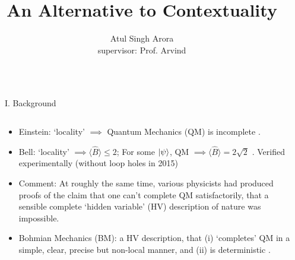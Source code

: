 \documentclass[final,hyperref={pdfpagelabels=false}]{beamer}
\title{\huge An Alternative to Contextuality} %
\author{Atul Singh Arora \\ \small supervisor: Prof. Arvind} %
\institute{Indian Institute of Science Education \& Research (IISER), Mohali} %
\newcommand{\mean}[1]{\langle #1 \rangle}
\begin{document}

\begin{frame}[t] %

  \begin{columns}[c] %

    \begin{column}{.015\textwidth}\end{column} %
    \begin{column}{.31\textwidth} %




      \begin{block}{I. Background}
        \begin{columns}
          \begin{column}{0.7\textwidth}
            \begin{itemize}
            \item Einstein: `locality' $\implies$ Quantum Mechanics (QM) is incomplete \cite{EPR}. 

            \item Bell: `locality'  $\implies \mean {\hat B} \le 2$; For some $\ket{\psi}$, QM $\implies \mean{\hat B} = 2\sqrt 2$ \cite{Bell}. Verified experimentally (without loop holes in 2015)

            \item Comment: At roughly the same time, various physicists had produced proofs of the claim that one can't complete QM satisfactorily, that a sensible complete `hidden variable' (HV) description of nature was impossible. 

            \item Bohmian Mechanics (BM): a HV description, that (i) `completes' QM in a simple, clear, precise but non-local manner, and (ii) is deterministic \cite{bohm1}.


\end{itemize}
\end{column}
\end{columns}
\end{block}
\end{column}
\end{columns}
\end{frame}
\end{document}
